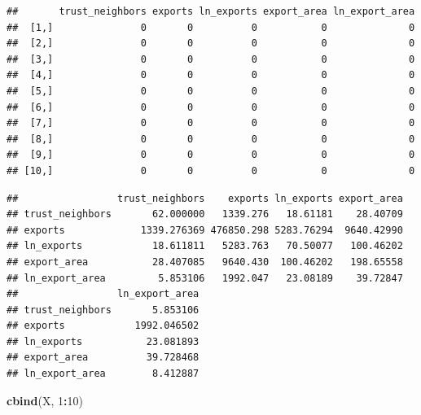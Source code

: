 \documentclass[]{book}
\newenvironment{Shaded}{\begin{snugshade}}{\end{snugshade}}
\newcommand{\KeywordTok}[1]{\textcolor[rgb]{0.13,0.29,0.53}{\textbf{#1}}}
\newcommand{\DecValTok}[1]{\textcolor[rgb]{0.00,0.00,0.81}{#1}}
\newcommand{\StringTok}[1]{\textcolor[rgb]{0.31,0.60,0.02}{#1}}
\newcommand{\OperatorTok}[1]{\textcolor[rgb]{0.81,0.36,0.00}{\textbf{#1}}}
\newcommand{\NormalTok}[1]{#1}
\theoremstyle{definition}
\theoremstyle{definition}
\theoremstyle{definition}
\theoremstyle{remark}
\begin{document}
\begin{verbatim}
##       trust_neighbors exports ln_exports export_area ln_export_area
##  [1,]               0       0          0           0              0
##  [2,]               0       0          0           0              0
##  [3,]               0       0          0           0              0
##  [4,]               0       0          0           0              0
##  [5,]               0       0          0           0              0
##  [6,]               0       0          0           0              0
##  [7,]               0       0          0           0              0
##  [8,]               0       0          0           0              0
##  [9,]               0       0          0           0              0
## [10,]               0       0          0           0              0
\end{verbatim}

\begin{Shaded}
\end{Shaded}

\begin{verbatim}
##                 trust_neighbors    exports ln_exports export_area
## trust_neighbors       62.000000   1339.276   18.61181    28.40709
## exports             1339.276369 476850.298 5283.76294  9640.42990
## ln_exports            18.611811   5283.763   70.50077   100.46202
## export_area           28.407085   9640.430  100.46202   198.65558
## ln_export_area         5.853106   1992.047   23.08189    39.72847
##                 ln_export_area
## trust_neighbors       5.853106
## exports            1992.046502
## ln_exports           23.081893
## export_area          39.728468
## ln_export_area        8.412887
\end{verbatim}

\begin{Shaded}
\begin{Highlighting}[]
\KeywordTok{cbind}\NormalTok{(X, }\DecValTok{1}\OperatorTok{:}\DecValTok{10}\NormalTok{)}
\end{Highlighting}
\end{Shaded}
\end{document}
